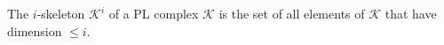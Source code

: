 The $i$-skeleton $\mathcal{K}^i$ of a PL complex $\mathcal{K}$ is the set of all elements of $\mathcal{K}$ that have dimension $\leq i$.
